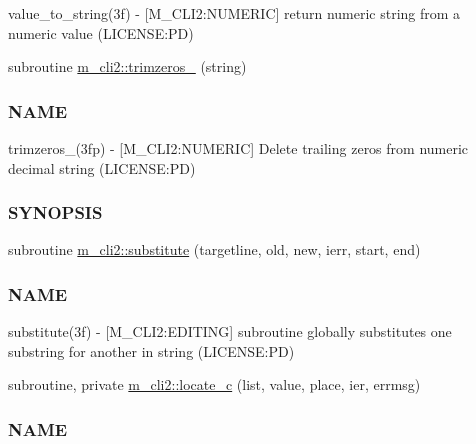 \begin{DoxyCompactItemize}
\begin{DoxyCompactList}
value\+\_\+to\+\_\+string(3f) -\/ \mbox{[}M\+\_\+\+C\+L\+I2\+:N\+U\+M\+E\+R\+IC\mbox{]} return numeric string from a numeric value (L\+I\+C\+E\+N\+SE\+:PD) \end{DoxyCompactList}\item 
subroutine \mbox{\hyperlink{namespacem__cli2_a770a66475094fd80493d46498de1ebf7}{m\+\_\+cli2\+::trimzeros\+\_\+}} (string)
\begin{DoxyCompactList}\small\item\em \subsubsection*{N\+A\+ME}

trimzeros\+\_\+(3fp) -\/ \mbox{[}M\+\_\+\+C\+L\+I2\+:N\+U\+M\+E\+R\+IC\mbox{]} Delete trailing zeros from numeric decimal string (L\+I\+C\+E\+N\+SE\+:PD) \subsubsection*{S\+Y\+N\+O\+P\+S\+IS}\end{DoxyCompactList}\item 
subroutine \mbox{\hyperlink{namespacem__cli2_a76af7f7c39e6755e024890d85d488704}{m\+\_\+cli2\+::substitute}} (targetline, old, new, ierr, start, end)
\begin{DoxyCompactList}\small\item\em \subsubsection*{N\+A\+ME}

substitute(3f) -\/ \mbox{[}M\+\_\+\+C\+L\+I2\+:E\+D\+I\+T\+I\+NG\mbox{]} subroutine globally substitutes one substring for another in string (L\+I\+C\+E\+N\+SE\+:PD) \end{DoxyCompactList}\item 
subroutine, private \mbox{\hyperlink{namespacem__cli2_a2199778fea512efcde8778f20765643a}{m\+\_\+cli2\+::locate\+\_\+c}} (list, value, place, ier, errmsg)
\begin{DoxyCompactList}\small\item\em \subsubsection*{N\+A\+ME}


\end{DoxyCompactList}
\end{DoxyCompactItemize}
